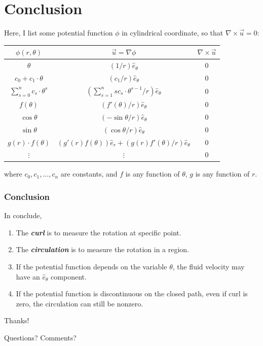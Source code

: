 \documentclass[11pt,]{beamer}
\begin{document}
\section{Conclusion}
\begin{frame}
	Here, I list some potential function $\phi$ in cylindrical coordinate, so that $\nabla\times\vec{u}=0$:
	\begin{table}[t]
	\begin{tabular}{c|c|c}
	$\phi(r,\theta)$	&	$\vec{u}=\nabla \phi$	& 	$\nabla \times \vec{u}$ \\\hline\hline
	$\theta$	& 	$\displaystyle \left(1/r\right) \hat{e}_{\theta}$&$0$
	\\\hline
	$c_0+c_1\cdot\theta$	& 	$ \left(c_1/r\right) \hat{e}_{\theta}$&$0$
	\\\hline
	$\sum_{s=0}^{n}c_{s}\cdot\theta^{s}$	& $\left(\sum_{s=1}^{n}sc_{s}\cdot\theta^{s-1}/r\right) \hat{e}_{\theta}$&$0$
	\\\hline
	$f(\theta)$	& 	$\left(f'(\theta)/r\right) \hat{e}_{\theta}$	&	$0$
	\\\hline
	$\cos\theta$	& 	$\left(-\sin\theta/r\right) \hat{e}_{\theta}$	&	$0$
	\\\hline
	$\sin\theta$	& 	$\left(\cos\theta/r\right) \hat{e}_{\theta}$	&	$0$
	\\\hline
	$g(r)\cdot f(\theta)$	& 	$\left(g'(r) f(\theta)\right) \hat{e}_{r} + \left(g(r) f'(\theta)/r\right) \hat{e}_{\theta}$	&	$0$
	\\\hline
	$\vdots$	& 	$\vdots$	&	$0$  \\
	\end{tabular}
	\end{table}
	where $c_0,c_1,\ldots,c_n$ are constants, and $f$ is any function of $\theta$, $g$ is any function of $r$. 
\end{frame}
\begin{frame}
\frametitle{Conclusion}
In conclude, 
\begin{enumerate}
\item The \textbf{\textit{curl}} is to measure the rotation at specific point. 
\item The \textbf{\textit{circulation}} is to measure the rotation in a region.
\item If the potential function depends on the variable $\theta$, the fluid velocity may have an $\hat{e}_{\theta}$ component. 
\item If the potential function is discontinuous on the closed path, even if curl is zero, the circulation can still be nonzero.
\end{enumerate}
\end{frame}
\begin{frame}
	\begin{center}
		\bigskip\bigskip\bigskip
		{\Huge Thanks!}
		
		\bigskip\bigskip
		
		{\LARGE Questions? Comments?}
	\end{center}
\end{frame}


\end{document}
